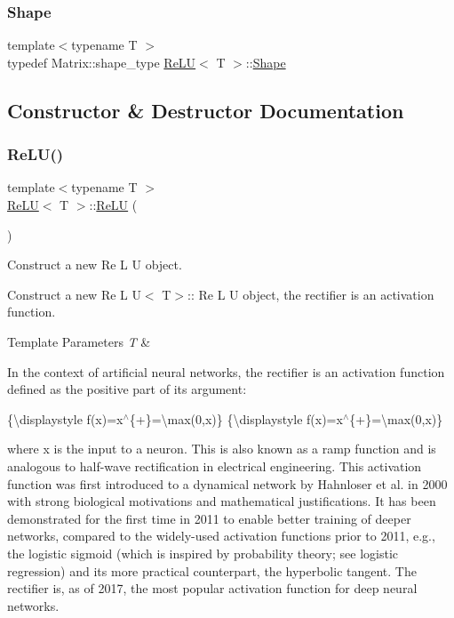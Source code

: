 \subsubsection{\texorpdfstring{Shape}{Shape}}
{\footnotesize\ttfamily template$<$typename T $>$ \\
typedef Matrix\+::shape\+\_\+type \mbox{\hyperlink{class_re_l_u}{Re\+LU}}$<$ T $>$\+::\mbox{\hyperlink{class_re_l_u_ae27e6aba0a09baa85b8ef8679db42719}{Shape}}}



\subsection{Constructor \& Destructor Documentation}
\mbox{\label{class_re_l_u_ad378d979e537b8af65513b3cb9bfe2b1}} 
\subsubsection{\texorpdfstring{ReLU()}{ReLU()}}
{\footnotesize\ttfamily template$<$typename T $>$ \\
\mbox{\hyperlink{class_re_l_u}{Re\+LU}}$<$ T $>$\+::\mbox{\hyperlink{class_re_l_u}{Re\+LU}} (\begin{DoxyParamCaption}{ }\end{DoxyParamCaption})}



Construct a new Re L U object. 

Construct a new Re L U$<$ T$>$\+:: Re L U object, the rectifier is an activation function.


\begin{DoxyTemplParams}{Template Parameters}
{\em T} & \\
\hline
\end{DoxyTemplParams}
In the context of artificial neural networks, the rectifier is an activation function defined as the positive part of its argument\+:

\{\textbackslash{}displaystyle f(x)=x$^\wedge$\{+\}=\textbackslash{}max(0,x)\} \{\textbackslash{}displaystyle f(x)=x$^\wedge$\{+\}=\textbackslash{}max(0,x)\}

where x is the input to a neuron. This is also known as a ramp function and is analogous to half-\/wave rectification in electrical engineering. This activation function was first introduced to a dynamical network by Hahnloser et al. in 2000 with strong biological motivations and mathematical justifications. It has been demonstrated for the first time in 2011 to enable better training of deeper networks, compared to the widely-\/used activation functions prior to 2011, e.\+g., the logistic sigmoid (which is inspired by probability theory; see logistic regression) and its more practical counterpart, the hyperbolic tangent. The rectifier is, as of 2017, the most popular activation function for deep neural networks. \mbox{\label{class_re_l_u_a6694b0386daea4398ad932f92382e206}} 
